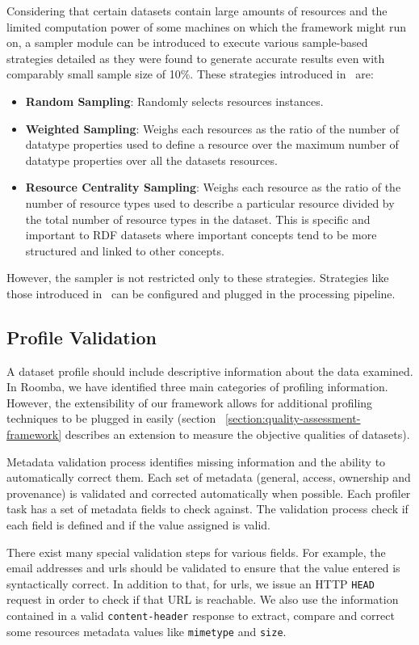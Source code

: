 Considering that certain datasets contain large amounts of resources and the limited computation power of some machines on which the framework might run on, a sampler module can be introduced to execute various sample-based strategies detailed as they were found to generate accurate results even with comparably small sample size of 10\%. These strategies introduced in~\cite{Fetahu:ESWC:14} are:
\begin{itemize}
  \item \textbf{Random Sampling}: Randomly selects resources instances.
  \item \textbf{Weighted Sampling}: Weighs each resources as the ratio of the number of datatype properties used to define a resource over the maximum number of datatype properties over all the datasets resources.
  \item \textbf{Resource Centrality Sampling}: Weighs each resource as the ratio of the number of resource types used to describe a particular resource divided by the total number of resource types in the dataset. This is specific and important to RDF datasets where important concepts tend to be more structured and linked to other concepts.
\end{itemize}

However, the sampler is not restricted only to these strategies. Strategies like those introduced in~\cite{Leskovec:KDD:06} can be configured and plugged in the processing pipeline.

\subsection{Profile Validation}
A dataset profile should include descriptive information about the data examined. In Roomba, we have identified three main categories of profiling information. However, the extensibility of our framework allows for additional profiling techniques to be plugged in easily (section ~\ref{section:quality-assessment-framework} describes an extension to measure the objective qualities of datasets).

Metadata validation process identifies missing information and the ability to automatically correct them. Each set of metadata (general, access, ownership and provenance) is validated and corrected automatically when possible. Each profiler task has a set of metadata fields to check against. The validation process check if each field is defined and if the value assigned is valid.

There exist many special validation steps for various fields. For example, the email addresses and urls should be validated to ensure that the value entered is syntactically correct. In addition to that, for urls, we issue an HTTP \texttt{HEAD} request in order to check if that URL is reachable. We also use the information contained in a valid \texttt{content-header} response to extract, compare and correct some resources metadata values like \texttt{mimetype} and \texttt{size}.

